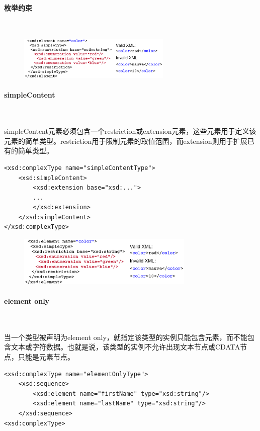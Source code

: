 \paragraph*{枚举约束}~{} \par
\begin{figure}[H]
    \vspace{-0.5em}
	\centering
	\includegraphics[width=0.65\textwidth]{images/枚举约束}
    \vspace{-1em}
\end{figure}

\paragraph*{simpleContent}~{} \par
simpleContent元素必须包含一个restriction或extension元素，这些元素用于定义该元素的简单类型。restriction用于限制元素的取值范围，而extension则用于扩展已有的简单类型。

\begin{lstlisting}
<xsd:complexType name="simpleContentType">
	<xsd:simpleContent>
		<xsd:extension base="xsd:...">
		...
		</xsd:extension>
	</xsd:simpleContent>
</xsd:complexType>
\end{lstlisting}

\begin{figure}[H]
    \vspace{-0.5em}
	\centering
	\includegraphics[width=0.75\textwidth]{images/枚举约束}
    \vspace{-1em}
\end{figure}

\paragraph*{element only}~{} \par
当一个类型被声明为element only，就指定该类型的实例只能包含元素，而不能包含文本或字符数据。也就是说，该类型的实例不允许出现文本节点或CDATA节点，只能是元素节点。
\begin{lstlisting}
<xsd:complexType name="elementOnlyType">
	<xsd:sequence>
		<xsd:element name="firstName" type="xsd:string"/>
		<xsd:element name="lastName" type="xsd:string"/>
	</xsd:sequence>
<xsd:complexType>
\end{lstlisting}

